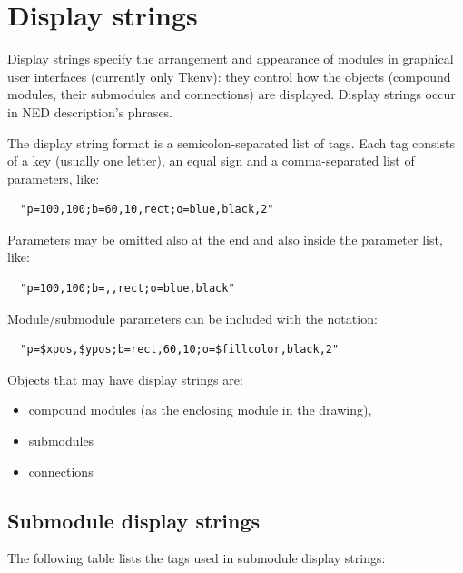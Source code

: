 \section{Display strings}
\label{sec:ch-ned-lang:display-strings}


Display strings specify the arrangement and
appearance of modules in graphical user interfaces (currently only
Tkenv): they control how the objects (compound modules, their
submodules and connections) are displayed. Display strings occur in
NED description's 
phrases.

The display string format is a semicolon-separated list of tags.
Each tag consists of a key (usually one letter), an equal sign
and a comma-separated list of parameters, like:

\begin{verbatim}
  "p=100,100;b=60,10,rect;o=blue,black,2"
\end{verbatim}

Parameters may be omitted also at the end and also inside the
parameter list, like:

\begin{verbatim}
  "p=100,100;b=,,rect;o=blue,black"
\end{verbatim}

Module/submodule parameters can be included with the  notation:

\begin{verbatim}
  "p=$xpos,$ypos;b=rect,60,10;o=$fillcolor,black,2"
\end{verbatim}

Objects that may have display strings are:
\begin{itemize}
  \item{compound modules (as the enclosing module in the drawing),}
  \item{submodules}
  \item{connections}
\end{itemize}



\subsection{Submodule display strings}


The following table lists the tags used in submodule display strings:


